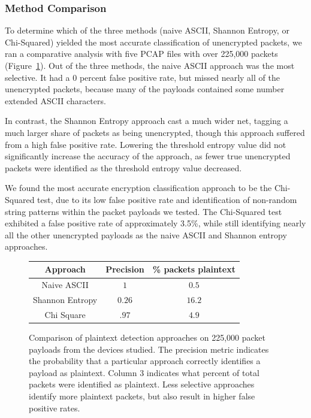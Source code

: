 \subsubsection{Method Comparison}

To determine which of the three methods (naive ASCII, Shannon Entropy, or Chi-Squared)
yielded the most accurate classification of unencrypted packets, we ran a comparative analysis with five PCAP files with over 225,000 packets (Figure~\ref{fig:method-comp}). Out of the three methods, the naive ASCII approach was the most selective. It had a 0 percent false positive rate, but missed nearly all of the unencrypted packets, because many of the payloads contained some number extended ASCII characters. 

In contrast, the Shannon Entropy approach cast a much wider net, tagging a much larger share of packets as being unencrypted, though this approach suffered from a high false positive rate. Lowering the threshold entropy value did not significantly increase the accuracy of the approach, as fewer true unencrypted packets were identified as the threshold entropy value decreased. 

We found the most accurate encryption classification approach to be the Chi-Squared
test, due to its low false positive rate and identification of non-random string patterns within the packet payloads we tested. The Chi-Squared test exhibited a false positive rate of approximately 3.5\%, while still identifying nearly all the other unencrypted payloads as the naive ASCII and Shannon entropy approaches.


\begin{figure}
  \begin{center}
    \begin{tabular}{c|c|c} 
    \textbf{Approach} & \textbf{Precision} & \textbf{\% packets plaintext}\\ [0.5ex] 
    \hline
    Naive ASCII & $1$ & $0.5$ \\ 
    Shannon Entropy &  $0.26$ & $16.2$ \\
    Chi Square & $.97$ & $4.9$ \\
    \end{tabular}
    \caption{Comparison of plaintext detection approaches on 225,000 packet payloads from the devices studied. The precision metric indicates the probability that a particular approach correctly identifies a payload as plaintext. Column 3 indicates what percent of total packets were identified as plaintext. Less selective approaches identify more plaintext packets, but also result in higher false positive rates.}
    \label{fig:method-comp}
  \end{center}
\end{figure}


